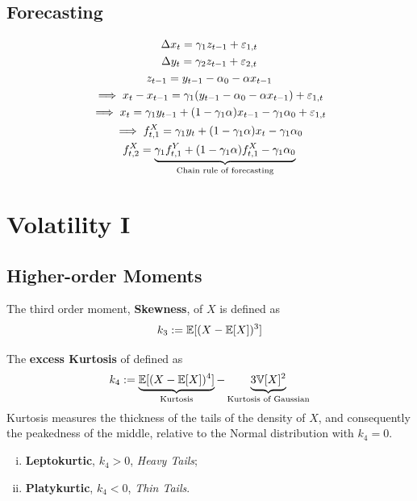 \documentclass[11pt]{article}
\begin{document}
        \subsection{Forecasting}
            \begin{example}
                \begin{gather}
                    \Delta x_t = \gamma_1 z_{t-1} + \varepsilon_{1,t} \\
                    \Delta y_t = \gamma_2 z_{t-1} + \varepsilon_{2,t} \\
                    z_{t-1} = y_{t-1} - \alpha_0 - \alpha x_{t-1} \\
                    \implies x_t - x_{t-1} = \gamma_1(y_{t-1} - \alpha_0 - \alpha x_{t-1}) + \varepsilon_{1,t} \\
                    \implies x_t = \gamma_1 y_{t-1} + (1 - \gamma_1 \alpha) x_{t-1} - \gamma_1 \alpha_0 + \varepsilon_{1,t} \\
                    \implies f^X_{t,1} = \gamma_1 y_t + (1 - \gamma_1 \alpha) x_t - \gamma_1 \alpha_0 \\
                    f^X_{t,2} = \underbrace{\gamma_1 f^Y_{t,1} + (1 - \gamma_1 \alpha) f^X_{t,1} - \gamma_1 \alpha_0}_{\text{{Chain rule of forecasting}}}
                \end{gather}
            \end{example}
            
	\section{Volatility I}
		\subsection{Higher-order Moments}
			\begin{definition}
				The third order moment, \textbf{Skewness}, of $X$ is defined as 
				\begin{equation}
					k_3 := \mathbb{E}[{(X - \mathbb{E}[{X}])^3}]
				\end{equation}
			\end{definition}
			
			\begin{definition}
				The \textbf{excess Kurtosis} of defined as
				\begin{equation}
					k_4 := \underbrace{\mathbb{E}[{(X - \mathbb{E}[{X}])^4}]}_{\text{{Kurtosis}}} - \underbrace{3 \mathbb{V}[{X}]^2}_{\text{{Kurtosis of Gaussian}}}
				\end{equation}
				Kurtosis measures the thickness of the tails of the density of $X$, and consequently the peakedness of the middle, relative to the Normal distribution with $k_4 = 0$.
				\begin{enumerate}[(i)]
					\item \textbf{Leptokurtic}, $k_4 > 0$, \emph{Heavy Tails};
					\item \textbf{Platykurtic}, $k_4 < 0$, \emph{Thin Tails}.
				\end{enumerate}
			\end{definition}
		
\end{document}

